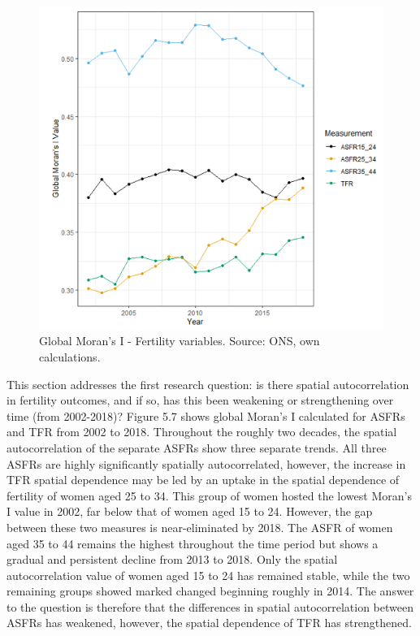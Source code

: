 \documentclass[12pt,twoside]{reedthesis}
\begin{document}
\begin{figure}
\includegraphics[width=0.95\linewidth]{figure/Figure_8} \caption{Global Moran's I - Fertility variables. Source: ONS, own calculations.}\label{fig:figure8}
\end{figure}
This section addresses the first research question: is there spatial autocorrelation in fertility outcomes, and if so, has this been weakening or strengthening over time (from 2002-2018)? Figure 5.7 shows global Moran's I calculated for ASFRs and TFR from 2002 to 2018. Throughout the roughly two decades, the spatial autocorrelation of the separate ASFRs show three separate trends. All three ASFRs are highly significantly spatially autocorrelated, however, the increase in TFR spatial dependence may be led by an uptake in the spatial dependence of fertility of women aged 25 to 34. This group of women hosted the lowest Moran's I value in 2002, far below that of women aged 15 to 24. However, the gap between these two measures is near-eliminated by 2018. The ASFR of women aged 35 to 44 remains the highest throughout the time period but shows a gradual and persistent decline from 2013 to 2018. Only the spatial autocorrelation value of women aged 15 to 24 has remained stable, while the two remaining groups showed marked changed beginning roughly in 2014. The answer to the question is therefore that the differences in spatial autocorrelation between ASFRs has weakened, however, the spatial dependence of TFR has strengthened.
\end{document}
